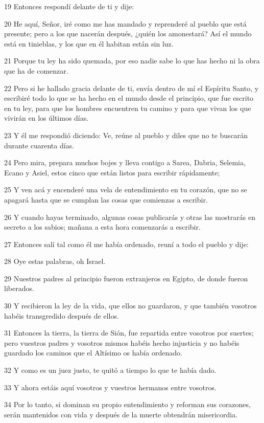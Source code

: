 \par 19 Entonces respondí delante de ti y dije:
\par 20 He aquí, Señor, iré como me has mandado y reprenderé al pueblo que está presente; pero a los que nacerán después, ¿quién los amonestará? Así el mundo está en tinieblas, y los que en él habitan están sin luz.
\par 21 Porque tu ley ha sido quemada, por eso nadie sabe lo que has hecho ni la obra que ha de comenzar.
\par 22 Pero si he hallado gracia delante de ti, envía dentro de mí el Espíritu Santo, y escribiré todo lo que se ha hecho en el mundo desde el principio, que fue escrito en tu ley, para que los hombres encuentren tu camino y para que vivan los que vivirán en los últimos días.
\par 23 Y él me respondió diciendo: Ve, reúne al pueblo y diles que no te buscarán durante cuarenta días.
\par 24 Pero mira, prepara muchos bojes y lleva contigo a Sarea, Dabria, Selemia, Ecano y Asiel, estos cinco que están listos para escribir rápidamente;
\par 25 Y ven acá y encenderé una vela de entendimiento en tu corazón, que no se apagará hasta que se cumplan las cosas que comienzas a escribir.
\par 26 Y cuando hayas terminado, algunas cosas publicarás y otras las mostrarás en secreto a los sabios; mañana a esta hora comenzarás a escribir.
\par 27 Entonces salí tal como él me había ordenado, reuní a todo el pueblo y dije:
\par 28 Oye estas palabras, oh Israel.
\par 29 Nuestros padres al principio fueron extranjeros en Egipto, de donde fueron liberados.
\par 30 Y recibieron la ley de la vida, que ellos no guardaron, y que también vosotros habéis transgredido después de ellos.
\par 31 Entonces la tierra, la tierra de Sión, fue repartida entre vosotros por suertes; pero vuestros padres y vosotros mismos habéis hecho injusticia y no habéis guardado los caminos que el Altísimo os había ordenado.
\par 32 Y como es un juez justo, te quitó a tiempo lo que te había dado.
\par 33 Y ahora estáis aquí vosotros y vuestros hermanos entre vosotros.
\par 34 Por lo tanto, si dominan su propio entendimiento y reforman sus corazones, serán mantenidos con vida y después de la muerte obtendrán misericordia.
